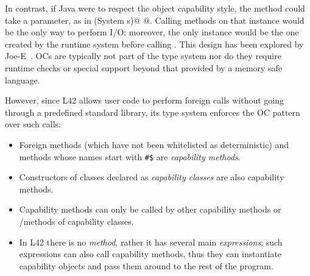 In contrast, if Java were to respect the object capability style, the \Q@main@ method could take a \Q@System@ parameter, as in
 \Q@main(System s)@
 \lstset{language=Java}
@. \lstset{language=FortyTwo}%
Calling methods on that \Q@System@ instance would be the only way to perform I/O;
moreover, the only \Q@System@ instance would be the one created by the runtime system before calling \Q@main@. %
This design has been explored by Joe-E~\cite{finifter2008verifiable}.
OCs are typically not part of the type system nor do they require runtime checks or special support beyond that provided by a memory safe language. 

However, since
L42 allows user code to perform foreign calls without going through a predefined standard library, its type system enforces the OC pattern over such calls:
\SSI\begin{itemize}
\item Foreign methods (which have not been whitelisted as deterministic) and methods whose names start with \texttt{\#\$} are \emph{capability methods}.%
\item Constructors of classes declared as \emph{capability classes} are also capability methods.
\item Capability methods can only be called by other capability methods or \Q@mut@/\Q@capsule@ methods of capability classes.
\item In L42 there is no \Q@main@ \emph{method}, rather it has several main \emph{expressions}; such expressions can also call capability methods, thus they can instantiate capability objects and pass them around to the rest of the program.

\end{itemize}

